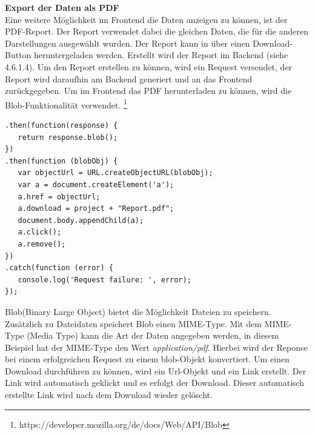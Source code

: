 \textbf{Export der Daten als PDF} \\
Eine weitere Möglichkeit im Frontend die Daten anzeigen zu können, ist der PDF-Report. Der Report verwendet dabei die gleichen Daten, die für die anderen Darstellungen ausgewählt wurden. Der Report kann in über einen Download-Button heruntergeladen werden. Erstellt wird der Report im Backend (siehe 4.6.1.4). Um den Report erstellen zu können, wird ein Request versendet, der Report wird daraufhin am Backend generiert und an das Frontend zurückgegeben. Um im Frontend das PDF herunterladen zu können, wird die Blob-Funktionalität verwendet. \footnote{https://developer.mozilla.org/de/docs/Web/API/Blob}

\lstset{
  caption={Herunterladen eines PDF-Files in Javascript mit Blob.}, 
  basicstyle=\small\ttfamily, 
  label=lst:blobDownload, 
  language=Java,
  frame=single,
  breaklines=true, %
  postbreak=\mbox{\textcolor{red}{$\hookrightarrow$}\space},
}

\begin{samepage}%
	\begin{lstlisting}[float=tbhp]
.then(function(response) {
   return response.blob(); 
})
.then(function (blobObj) {
   var objectUrl = URL.createObjectURL(blobObj);
   var a = document.createElement('a');
   a.href = objectUrl;
   a.download = project + "Report.pdf";
   document.body.appendChild(a);
   a.click();
   a.remove(); 
})
.catch(function (error) {
   console.log('Request failure: ', error);
});
	\end{lstlisting}
\end{samepage}

Blob(Binary Large Object) bietet die Möglichkeit Dateien zu speichern. Zusätzlich zu Dateidaten speichert Blob einen MIME-Type. Mit dem MIME-Type (Media Type) kann die Art der Daten angegeben werden, in diesem Beispiel hat der MIME-Type den Wert \textit{application/pdf}. Hierbei wird der Reponse bei einem erfolgreichen Request zu einem blob-Objekt konvertiert. Um einen Download durchführen zu können, wird ein Url-Objekt und ein Link erstellt. Der Link wird automatisch geklickt und es erfolgt der Download. Dieser automatisch erstellte Link wird nach dem Download wieder gelöscht.